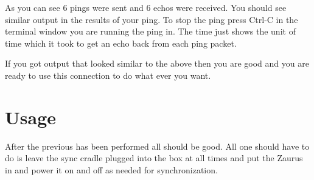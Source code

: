 \documentclass{article}
\begin{document}
As you can see 6 pings were sent and 6 echos were received. You should see
similar output in the results of your ping. To stop the ping press Ctrl-C in
the terminal window you are running
the ping in. The time just shows the unit of time which it took to get an echo
back from each ping packet.

If you got output that looked similar to the above then you are good and you
are ready to use this connection to do what ever you want.

\section{Usage}

After the previous has been performed all should be good. All one should
have to do is leave the sync cradle plugged into the box at all times and
put the Zaurus in and power it on and off as needed for
synchronization.



\end{document}
